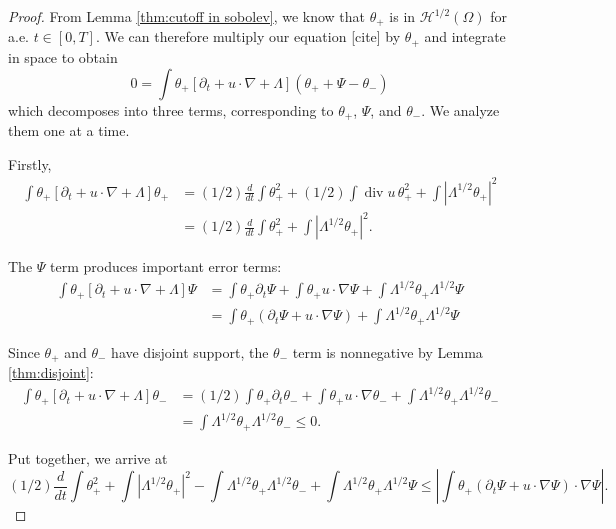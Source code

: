 \documentclass[11pt]{amsart}
\theoremstyle{remark}
\theoremstyle{definition}
\newcommand{\paren}[1]{\left( #1 \right)}
\newcommand{\bracket}[1]{\left[ #1 \right]}
\newcommand{\abs}[1]{\left\lvert #1 \right\rvert}
\newcommand{\del}{\partial}
\newcommand{\grad}{\nabla}
\newcommand{\ddt}{\frac{d}{dt}}
\renewcommand{\div}{\operatorname{div}}
\newcommand{\HD}{\mathcal{H}}
\begin{document}
\begin{proof}
From Lemma \ref{thm:cutoff in sobolev}, we know that $\theta_+$ is in $\HD^{1/2}(\Omega)$ for a.e. $t \in [0,T]$.  We can therefore multiply our equation [cite] by $\theta_+$ and integrate in space to obtain
\[ 0 = \int \theta_+ \bracket{ \del_t + u \cdot \grad + \Lambda } \paren{\theta_+ + \Psi - \theta_-} \]
which decomposes into three terms, corresponding to $\theta_+$, $\Psi$, and $\theta_-$.  We analyze them one at a time.  

Firstly,
\begin{align*} 
\int \theta_+ \bracket{ \del_t + u \cdot \grad + \Lambda } \theta_+ &= (1/2) \ddt \int \theta_+^2 + (1/2) \int \div u \, \theta_+^2 + \int \abs{\Lambda^{1/2} \theta_+}^2
\\ &= (1/2) \ddt \int \theta_+^2 + \int \abs{\Lambda^{1/2} \theta_+}^2.
\end{align*}

The $\Psi$ term produces important error terms:
\begin{align*} 
\int \theta_+ \bracket{ \del_t + u \cdot \grad + \Lambda } \Psi &= \int \theta_+ \del_t \Psi + \int \theta_+ u \cdot \grad \Psi + \int \Lambda^{1/2} \theta_+ \Lambda^{1/2} \Psi
\\ &= \int \theta_+ (\del_t \Psi + u \cdot \grad \Psi) + \int \Lambda^{1/2} \theta_+ \Lambda^{1/2} \Psi
\end{align*}

Since $\theta_+$ and $\theta_-$ have disjoint support, the $\theta_-$ term is nonnegative by Lemma \ref{thm:disjoint}:
\begin{align*} 
\int \theta_+ \bracket{ \del_t + u \cdot \grad + \Lambda } \theta_- &= (1/2) \int \theta_+ \del_t \theta_- + \int \theta_+ u \cdot \grad \theta_- + \int \Lambda^{1/2} \theta_+ \Lambda^{1/2} \theta_-
\\ &= \int \Lambda^{1/2} \theta_+ \Lambda^{1/2} \theta_- \leq 0.
\end{align*}

Put together, we arrive at 
\[ (1/2) \ddt \int \theta_+^2 + \int \abs{\Lambda^{1/2} \theta_+}^2 - \int \Lambda^{1/2}\theta_+ \Lambda^{1/2} \theta_- + \int \Lambda^{1/2} \theta_+ \Lambda^{1/2} \Psi \leq \abs{\int \theta_+ (\del_t \Psi + u \cdot \grad \Psi) \cdot \grad \Psi}. \]


\end{proof}
\end{document}

